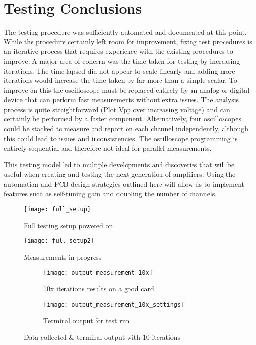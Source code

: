 \section{Testing Conclusions}
The testing procedure was sufficiently automated and documented at this point. While the procedure certainly left room for improvement, fixing test procedures is an iterative process that requires experience with the existing procedures to improve. A major area of concern was the time taken for testing by increasing iterations. The time lapsed did not appear to scale linearly and adding more iterations would increase the time taken by far more than a simple scalar. To improve on this the oscilloscope must be replaced entirely by an analog or digital device that can perform fast measurements without extra issues. The analysis process is quite straightforward (Plot Vpp over increasing voltage) and can certainly be performed by a faster component. Alternatively, four oscilloscopes could be stacked to measure and report on each channel independently, although this could lead to issues and inconsistencies. The oscilloscope programming is entirely sequential and therefore not ideal for parallel measurements.\par
This testing model led to multiple developments and discoveries that will be useful when creating and testing the next generation of amplifiers. Using the automation and PCB design strategies outlined here will allow us to implement features such as self-tuning gain and doubling the number of channels.
\FloatBarrier

\begin{figure}[!htb]
	\centering
	\texttt{[image: full\_setup]}
	\caption{Full testing setup powered on}
\end{figure}

\begin{figure}[!htb]
	\centering
	\texttt{[image: full\_setup2]}
	\caption{Measurements in progress}
\end{figure}

\begin{figure}
	\centering
	\begin{subfigure}[b]{0.4\textwidth}
		\texttt{[image: output\_measurement\_10x]}
		\caption{10x iterations results on a good card}
	\end{subfigure}
	\begin{subfigure}[b]{0.55\textwidth}
		\texttt{[image: output\_measurement\_10x\_settings]}
		\caption{Terminal output for test run}
	\end{subfigure}
	\caption{Data collected \& terminal output with 10 iterations}
\end{figure}
\FloatBarrier

